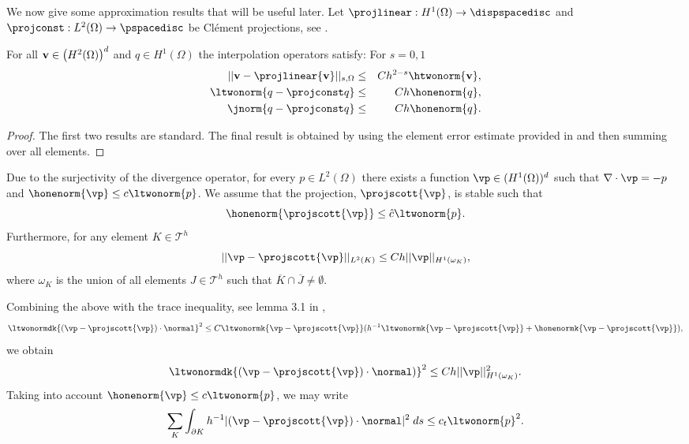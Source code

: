 We now give some approximation results that will be useful later. Let $\projlinear:  H^{1}(\Omega) \rightarrow \dispspacedisc$ and $\projconst: L^2(\Omega) \rightarrow \pspacedisc$  be Cl\'ement projections, see \cite{ciarlet2002}.
\begin{lemma}
\label{interp_error}
For all ${\bf v} \in \left( H^{2}(\Omega) \right)^{d}$ and  $q \in  H^{1}(\Omega)$ the interpolation operators satisfy: For $s=0,1$
\begin{eqnarray}
||{{\bf v} - \projlinear {\bf v}}||_{s,\Omega} & \leq & Ch^{2-s} \htwonorm{{\bf v}},  \\
 \ltwonorm{q - \projconst q} & \leq & Ch \honenorm{q}, \\
 \jnorm{q - \projconst q} & \leq & Ch \honenorm{q}.
\end{eqnarray}
\end{lemma}
\begin{proof}
The first two results are standard. The final result is obtained by using the element error estimate provided in \cite{verfurth1998posteriori} and  then summing over all elements.
\end{proof}

Due to the surjectivity of the divergence operator, for every $p \in  L^2(\Omega)$  there exists a function ${\vp} \in (H^1(\Omega))^d$ such that  $\nabla \cdot {\vp} = -p$ and $\honenorm{{\vp}} \leq c\ltwonorm{p} $.  We assume that the projection, $\projscott{\vp}$, is stable such that
\begin{equation}
 \honenorm{\projscott{\vp}} \leq  \hat{c}\ltwonorm{p}.
\label{clem_bound}
\end{equation}
Furthermore, for any element $ K \in \mathcal{T}^{h}$
\begin{equation}
\label{Clem_error}
||{{\vp} - \projscott {\vp}}||_{L^2(K)} \leq C h ||{{\vp}}||_{H^1( \omega_K)} ,
\end{equation}
where $\omega_K$ is the union of all elements $J\in \mathcal{T}^{h}$ such that $\overline{K} \cap \overline{J} \neq \emptyset$.

Combining the above with the trace inequality, see lemma 3.1 in \cite{verfurth1998posteriori},
\begin{equation}
\label{traceineq}
\ltwonormdk{  ({\vp} - \projscott {\vp})  \cdot \normal }^{2} \leq C \ltwonormk{{\vp} - \projscott {\vp} } (h^{-1}\ltwonormk{ {\vp} - \projscott {\vp} }  + \honenormk{{\vp} - \projscott {\vp} }  ),
\end{equation}
we obtain
\begin{equation}
\label{Clem_error_Kbdy}
\ltwonormdk{({\vp} - \projscott {\vp}) \cdot \normal )}^{2} \leq C h ||{{\vp}}||_{H^1( \omega_K)} ^{2}.
\end{equation}
Taking into account $\honenorm{{\vp}} \leq c\ltwonorm{p} $, we may write
\begin{equation}
\label{clem_jump_error}
\sum_{K} \int_{\partial K } h^{-1} |({\vp} - \projscott {\vp}) \cdot \normal|^{2} \;ds \leq c_{t} \ltwonorm{p}^{2}.
\end{equation}


